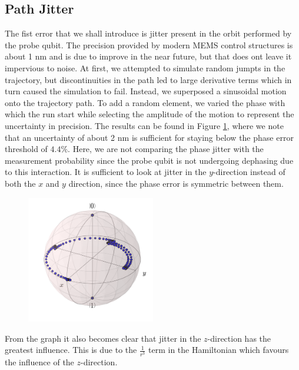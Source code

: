 \subsection{Path Jitter}\label{sec:jitter}
The fist error that we shall introduce is jitter present in the orbit performed by the probe qubit. The precision provided by modern MEMS control structures is about 1 nm \cite{MEMS precision} and is due to improve in the near future, but that does ont leave it impervious to noise. At first, we attempted to simulate random jumpts in the trajectory, but discontinuities in the path led to large derivative terms which in turn caused the simulation to fail. Instead, we superposed a sinusoidal motion onto the trajectory path. To add a random element, we varied the phase with which the run start while selecting the amplitude of the motion to represent the uncertainty in precision. The results can be found in Figure \ref{fig:pathjitter}, where we note that an uncertainty of about 2 nm is sufficient for staying below the phase error threshold of $4.4 \%$. Here, we are not comparing the phase jitter with the measurement probability since the probe qubit is not undergoing dephasing due to this interaction. It is sufficient to look at jitter in the $y$-direction instead of both the $x$ and $y$ direction, since the phase error is symmetric between them. 



\begin{figure}[h]
  \centering
    \includegraphics[width=0.5\textwidth]{../Figures/Circ_orbit_odd_100_dephasing.png}
      \caption{ }
      \label{fig:pathjitter}
\end{figure}


From the graph it also becomes clear that jitter in the $z$-direction has the greatest influence. This is due to the $\frac{1}{r^3}$  term in the Hamiltonian which favours the influence of the $z$-direction. 





